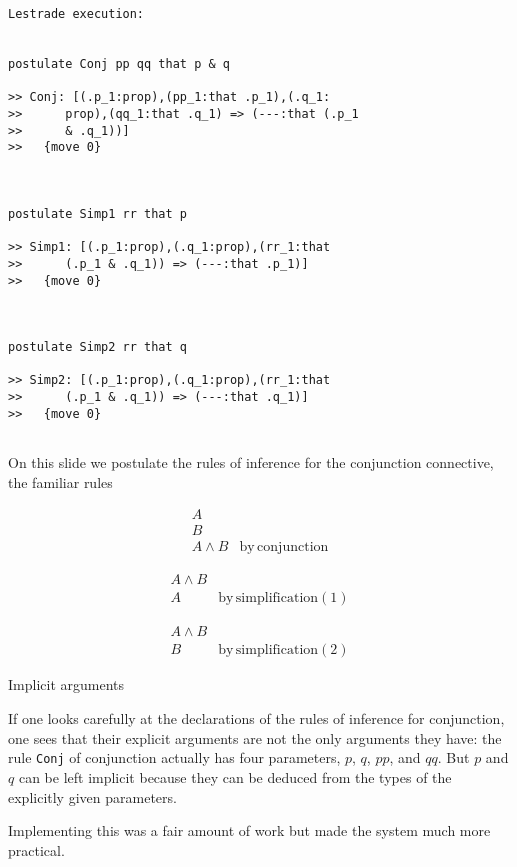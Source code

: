 \documentclass{slides}
\begin{document}
\begin{slide}

{\small 

\begin{verbatim}Lestrade execution:


postulate Conj pp qq that p & q

>> Conj: [(.p_1:prop),(pp_1:that .p_1),(.q_1:
>>      prop),(qq_1:that .q_1) => (---:that (.p_1
>>      & .q_1))]
>>   {move 0}



postulate Simp1 rr that p

>> Simp1: [(.p_1:prop),(.q_1:prop),(rr_1:that
>>      (.p_1 & .q_1)) => (---:that .p_1)]
>>   {move 0}



postulate Simp2 rr that q

>> Simp2: [(.p_1:prop),(.q_1:prop),(rr_1:that
>>      (.p_1 & .q_1)) => (---:that .q_1)]
>>   {move 0}


\end{verbatim}
}

\end{slide}

\begin{slide}

On this slide we postulate the rules of inference for the conjunction connective, the familiar rules

$$\begin{array}{cc}
A & \\

B & \\ \hline

A \wedge B& \mathrm{by \,  conjunction}\end{array}$$

$$\begin{array}{cc}

A \wedge B & \\ \hline

A & \mathrm{by \, simplification(1)}\end{array}$$

$$\begin{array}{cc}

A \wedge B & \\ \hline

B & \mathrm{by \, simplification(2)}\end{array}$$

\end{slide}

\begin{slide}

{\Large Implicit arguments}

If one looks carefully at the declarations of the rules of inference for conjunction, one sees that their explicit arguments are not the only arguments they have:
the rule {\tt Conj} of conjunction actually has four parameters, $p$, $q$, $pp$, and $qq$.  But $p$ and $q$ can be left implicit because they can be deduced from the types of the explicitly given parameters.

Implementing this was a fair amount of work but made the system much more practical.

\end{slide}
\end{document}
